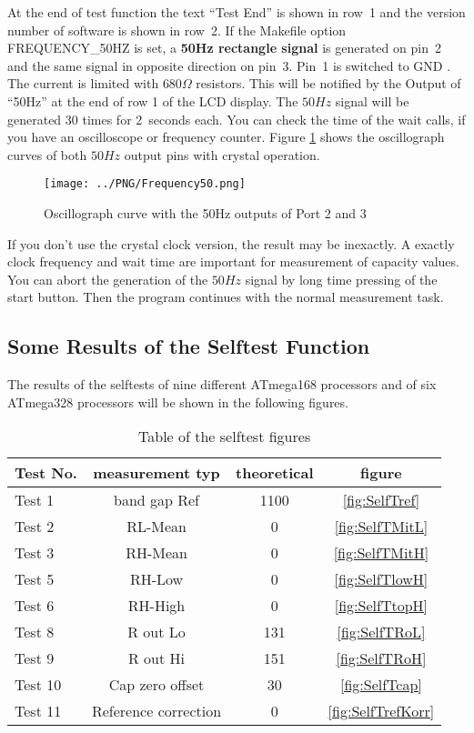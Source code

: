 At the end of test function the text ``Test End''  is shown in row~1 and the version number of software is shown in row~2.
If the Makefile option FREQUENCY\_50HZ is set, a \textbf {50Hz rectangle signal} is generated on pin~2 and 
the same signal in opposite direction on pin~3.
Pin~1 is switched to GND . The current is limited with \(680\Omega\) resistors.
This will be notified by the Output of ``50Hz'' at the end of row 1 of the LCD display.
The \(50Hz\) signal will be generated 30 times for 2~seconds each.
You can check the time of the wait calls, if you have an oscilloscope or frequency counter.
Figure \ref{fig:Frequency50} shows the oscillograph curves of both \(50Hz\) output pins with crystal operation.

\begin{figure}[H]
\centering
\texttt{[image: ../PNG/Frequency50.png]}
\caption{Oscillograph curve with the 50Hz outputs of Port 2 and 3}
\label{fig:Frequency50}
\end{figure}


If you don't use the crystal clock version, the result may be inexactly.
A exactly clock frequency and wait time are important for measurement of capacity values.
You can abort the generation of the \(50Hz\) signal by long time pressing of the start button.
Then the program continues with the normal measurement task.

\subsection{Some Results of the Selftest Function}

The results of the selftests of nine different ATmega168 processors and of six ATmega328 processors
will be shown in the following figures.

\begin{table}[H]
  \begin{center}
    \begin{tabular}{| l | c | c | c |}
    \hline
Test No. & measurement typ & theoretical & figure \\
    \hline
    \hline
Test 1 & band gap Ref  & 1100 & \ref{fig:SelfTref} \\
    \hline
Test 2 & RL-Mean & 0 & \ref{fig:SelfTMitL} \\
    \hline
Test 3 & RH-Mean & 0 & \ref{fig:SelfTMitH} \\
    \hline
Test 5 & RH-Low &  0 & \ref{fig:SelfTlowH} \\
    \hline
Test 6 & RH-High & 0 & \ref{fig:SelfTtopH} \\
    \hline
Test 8 & R out Lo & 131 & \ref{fig:SelfTRoL} \\
    \hline
Test 9 & R out Hi & 151 & \ref{fig:SelfTRoH} \\
    \hline
Test 10 & Cap zero offset & 30 & \ref{fig:SelfTcap} \\
    \hline
Test 11 & Reference correction & 0 & \ref{fig:SelfTrefKorr} \\
    \hline
    \end{tabular}
  \end{center}
  \caption{Table of the selftest figures }
  \label{tab:test_m168} 
\end{table}

